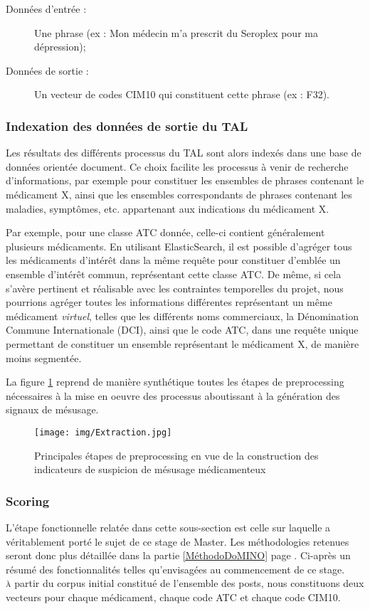 \documentclass[a4paper, 12pt, openany, oneside, abstract=on]{article} %
\begin{document}
\begin{description}
    \item[Données d'entrée :] Une phrase (ex : Mon médecin m'a prescrit du Seroplex pour ma dépression);
    \item[Données de sortie :] Un vecteur de codes CIM10 qui constituent cette phrase (ex : F32). 
\end{description}

\subsubsection{Indexation des données de sortie du TAL}
Les résultats des différents processus du TAL sont alors indexés dans une base de données orientée document. Ce choix facilite les processus à venir de recherche d'informations, par exemple pour constituer les ensembles de phrases contenant le médicament X, ainsi que les ensembles correspondants de phrases contenant les maladies, symptômes, etc. appartenant aux indications du médicament X.

Par exemple, pour une classe ATC donnée, celle-ci contient généralement plusieurs médicaments. En utilisant ElasticSearch\cite{Banon}, il est possible d'agréger tous les médicaments d'intérêt dans la même requête pour constituer d'emblée un ensemble d'intérêt commun, représentant cette classe ATC.
De même, si cela s'avère pertinent et réalisable avec les contraintes temporelles du projet, nous pourrions agréger toutes les informations différentes représentant un même médicament \emph{virtuel}, telles que les différents noms commerciaux, la Dénomination Commune Internationale (DCI), ainsi que le code ATC, dans une requête unique permettant de constituer un ensemble représentant le médicament X, de manière moins segmentée.\label{limiteAgregMedic}

La figure \ref{fig:preProcess} reprend de manière synthétique toutes les étapes de preprocessing nécessaires à la mise en oeuvre des processus aboutissant à la génération des signaux de mésusage.
\begin{figure}[H]
    \centering
    \texttt{[image: img/Extraction.jpg]}
    \caption{\label{fig:preProcess}Principales étapes de preprocessing en vue de la construction des indicateurs de suspicion de mésusage médicamenteux}
\end{figure}

\subsubsection{Scoring}
L'étape fonctionnelle relatée dans cette sous-section est celle sur laquelle a véritablement porté le sujet de ce stage de Master. Les méthodologies retenues seront donc plus détaillée dans la partie \ref{MéthodoDoMINO} page \pageref{MéthodoDoMINO}. Ci-après un résumé des fonctionnalités telles qu'envisagées au commencement de ce stage.\\
\textsc{à} partir du corpus initial constitué de l'ensemble des posts, nous constituons deux vecteurs pour chaque médicament, chaque code ATC et chaque code CIM10.
\end{document}
